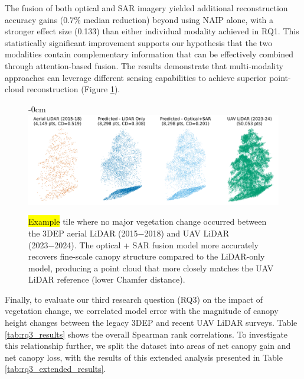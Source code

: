 \documentclass[remotesensing,article,accept,pdftex,moreauthors]{Definitions/mdpi}
\begin{document}
The fusion of both optical and SAR imagery yielded additional reconstruction accuracy gains (0.7\% median reduction) beyond using NAIP alone, with a stronger effect size (0.133) than either individual modality achieved in RQ1. This statistically significant improvement supports our hypothesis that the two modalities contain complementary information that can be effectively combined through attention-based fusion. The results demonstrate that multi-modality approaches can leverage different sensing capabilities to achieve superior point-cloud reconstruction (Figure \ref{fig:model_output_example}).


\vspace{-3pt}


\begin{figure}[H]
\begin{adjustwidth}{-\extralength}{0cm}
\centering
    \includegraphics[width=1\linewidth]{figures/model_output_example.png}
    \end{adjustwidth}
    \caption{\hl{Example} %
 tile where no major vegetation change occurred between the 3DEP aerial LiDAR (2015−2018) and UAV LiDAR (2023−2024). The optical + SAR fusion model more accurately recovers fine-scale canopy structure compared to the LiDAR-only model, producing a point cloud that more closely matches the UAV LiDAR reference (lower Chamfer distance).}
    \label{fig:model_output_example}
\end{figure}




Finally, to evaluate our third research question (RQ3) on the impact of vegetation change, we correlated model error with the magnitude of canopy height changes between the legacy 3DEP and recent UAV LiDAR surveys. Table \ref{tab:rq3_results} shows the overall Spearman rank correlations. To investigate this relationship further, we split the dataset into areas of net canopy gain and net canopy loss, with the results of this extended analysis presented in Table \ref{tab:rq3_extended_results}.
\end{document}
